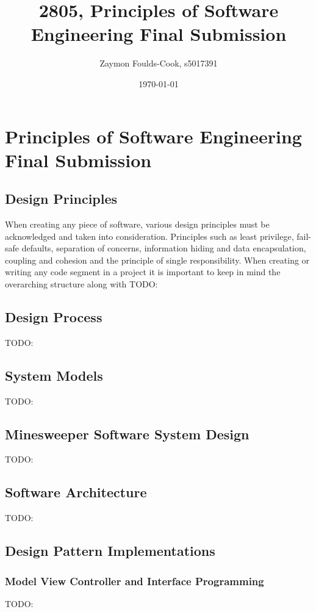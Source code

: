 \documentclass[12pt, a4]{report}
\title{2805, Principles of Software Engineering Final Submission}
\author{Zaymon Foulds-Cook, s5017391}%
\date{\today}
\begin{document}
\begin{titlepage}
	\maketitle
\end{titlepage}

\tableofcontents
\pagebreak

%
%
\section{Principles of Software Engineering Final Submission}
\subsection{Design Principles}
When creating any piece of software, various design principles must be acknowledged and taken into consideration. Principles such as least privilege, fail-safe defaults, separation of concerns, information hiding and data encapsulation, coupling and cohesion and the principle of single responsibility. When creating or writing any code segment in a project it is important to keep in mind the overarching structure along with 
TODO:

\subsection{Design Process}
TODO:

\subsection{System Models}
TODO:

\subsection{Minesweeper Software System Design}
TODO:

\subsection{Software Architecture}
TODO:

\subsection{Design Pattern Implementations}
\subsubsection{Model View Controller and Interface Programming}
TODO:
\end{document}
